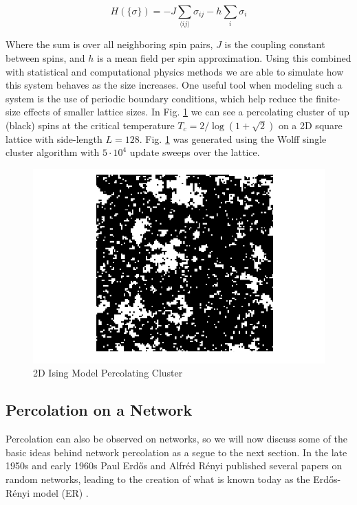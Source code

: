 \begin{equation}
	\label{eqn:Ising_Hamiltonian}
	H(\{\sigma\}) = -J \sum_{\langle i j \rangle} \sigma_{ij} -h \sum_i \sigma_i
\end{equation}

Where the sum is over all neighboring spin pairs, $J$ is the coupling constant between spins, and $h$ is a mean field per spin approximation.
Using this combined with statistical and computational physics methods we are able to simulate how this system behaves as the size increases.
One useful tool when modeling such a system is the use of periodic boundary conditions, which help reduce the finite-size effects of smaller lattice sizes.
In Fig. \ref{fig:Ising_percolation} we can see a percolating cluster of up (black) spins at the critical temperature $T_c = 2 / \log(1 + \sqrt{2})$ on a 2D square lattice with side-length $L = 128$.
Fig. \ref{fig:Ising_percolation} was generated using the Wolff single cluster algorithm with $5 \cdot 10^4$ update sweeps over the lattice.

\begin{figure}[H]
	\centering
	\includegraphics[width=350pt]{images/Ising_128_percolation.png}
	\caption{2D Ising Model Percolating Cluster}
	\label{fig:Ising_percolation}
\end{figure}









\subsection{Percolation on a Network}
Percolation can also be observed on networks, so we will now discuss some of the basic ideas behind network percolation as a segue to the next section.
In the late 1950s and early 1960s Paul Erdős and Alfréd Rényi published several papers on random networks, leading to the creation of what is known today as the Erdős-Rényi model (ER) \cite{ER_1} \cite{ER_2}.

